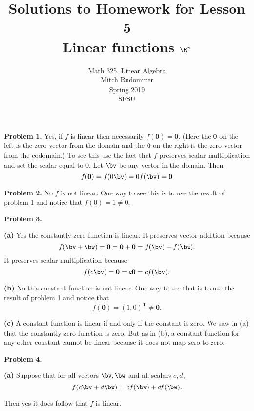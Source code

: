 \documentclass[oneside,12pt]{amsart}
\begin{document}
\title{Solutions to Homework for Lesson 5 \\ Linear functions $\R^n$}
\author{Math 325, Linear Algebra \\ Mitch Rudominer \\ Spring 2019 \\ SFSU }
\date{}

\maketitle

\textbf{Problem 1.} Yes, if $f$ is linear then necessarily
$f(\mathbf{0}) = \mathbf{0}$. (Here the $\mathbf{0}$ on the left is the
zero vector from the domain and the $\mathbf{0}$ on the right is the zero vector
from the codomain.) To see this use the fact that $f$ preserves scalar multiplication
and set the scalar equal to 0. Let $\bv$ be any vector in the domain. Then
$$f(\mathbf{0}) = f(0 \bv) = 0 f(\bv) = \mathbf{0}$$

\smallskip

\textbf{Problem 2.} No $f$ is not linear. One way to see this is to use the
result of problem 1 and notice that $f(0) = 1 \not= 0$.

\smallskip

\textbf{Problem 3.}

\textbf{(a)} Yes the constantly zero function is linear. It preserves vector
addition because
$$f(\bv + \bw) = \mathbf{0} = \mathbf{0} + \mathbf{0} = f(\bv) + f(\bw).$$
It preserves scalar multiplication because
$$f(c \bv) = \mathbf{0} = c \mathbf{0} = c f(\bv).$$

\smallskip

\textbf{(b)} No this constant function is not linear. One way to see that is
to use the result of problem 1 and notice that
$$f(\mathbf{0}) = (1, 0)^{\textbf{T}} \not= \mathbf{0}.$$

\smallskip

\textbf{(c)} A constant function is linear if and only if the constant is zero.
We saw in (a) that the constantly zero function is zero. But as in (b), a constant
function for any other constant cannot be linear because it does not map
zero to zero.

\smallskip

\textbf{Problem 4.}


\textbf{(a)} Suppose that for all vectors $\bv, \bw$ and all scalars $c, d$,
$$f(c\bv + d\bw) = c f(\bv) + d f (\bw).$$

Then yes it does follow that $f$ is linear.
\end{document}
